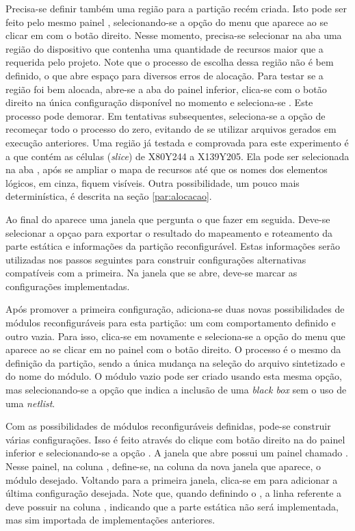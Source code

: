 \documentclass[11pt,a4paper,oneside]{book}
\begin{document}
Precisa-se definir também uma região para a partição recém criada.
Isto pode ser feito pelo mesmo painel , selecionando-se a opção  do menu que aparece ao se clicar em  com o botão direito.
Nesse momento, precisa-se selecionar na aba  uma região do dispositivo que contenha uma quantidade de recursos maior que a requerida pelo projeto.
Note que o processo de escolha dessa região não é bem definido, o que abre espaço para diversos erros de alocação.
Para testar se a região foi bem alocada, abre-se a aba  do painel inferior, clica-se com o botão direito na única configuração disponível no momento e seleciona-se .
Este processo pode demorar.
Em tentativas subsequentes, seleciona-se a opção de recomeçar todo o processo do zero, evitando de se utilizar arquivos gerados em execução anteriores.
Uma região já testada e comprovada para este experimento é a que contém as células (\textit{slice}) de X80Y244 a X139Y205.
Ela pode ser selecionada na aba , após se ampliar o mapa de recursos até que os nomes dos elementos lógicos, em cinza, fiquem visíveis.
Outra possibilidade, um pouco mais determinística, é descrita na seção \ref{par:alocacao}.

Ao final do  aparece uma janela que pergunta o que fazer em seguida.
Deve-se selecionar a opçao  para exportar o resultado do mapeamento e roteamento da parte estática e informações da partição reconfigurável.
Estas informações serão utilizadas nos passos seguintes para construir configurações alternativas compatíveis com a primeira.
Na janela que se abre, deve-se marcar as configurações implementadas.

Após promover a primeira configuração, adiciona-se duas novas possibilidades de módulos reconfiguráveis para esta partição: um com comportamento definido e outro vazia.
Para isso, clica-se em  novamente e seleciona-se a opção  do menu que aparece ao se clicar em  no painel  com o botão direito.
O processo é o mesmo da definição da partição, sendo a única mudança na seleção do arquivo sintetizado e do nome do módulo.
O módulo vazio pode ser criado usando esta mesma opção, mas selecionando-se a opção que indica a inclusão de uma \textit{black box} sem o uso de uma \textit{netlist}.

Com as possibilidades de módulos reconfiguráveis definidas, pode-se construir várias configurações.
Isso é feito através do clique com botão direito na  do painel inferior e selecionando-se a opção .
A janela que abre possui um painel chamado .
Nesse painel, na coluna , define-se, na coluna  da nova janela que aparece, o módulo desejado.
Voltando para a primeira janela, clica-se em  para adicionar a última configuração desejada.
Note que, quando definindo o , a linha referente a  deve possuir  na coluna , indicando que a parte estática não será implementada, mas sim importada de implementações anteriores.
\end{document}
